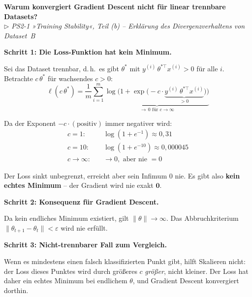 \documentclass[11pt, a4paper]{article}
\newenvironment{frage}[2]{%
  \begin{tcolorbox}[frageboxstyle, title={Frage}]
  \textbf{#1}\\[3pt]
  {\small\itshape\color{black!55}\(\triangleright\) #2}
  \end{tcolorbox}
  \begin{tcolorbox}[antwortboxstyle]
}{%
  \end{tcolorbox}
  \vspace{4mm}
}
\begin{document}
\begin{frage}{Warum konvergiert Gradient Descent nicht für linear trennbare Datasets?}{PS2-1 »Training Stability«, Teil (b) -- Erklärung des Divergenzverhaltens von Dataset~B}

\textbf{Schritt 1: Die Loss-Funktion hat kein Minimum.}

Sei das Dataset trennbar, d.\,h.\ es gibt $\theta^*$ mit $y^{(i)}\,\theta^{*\top} x^{(i)} > 0$
für alle $i$. Betrachte $c\,\theta^*$ für wachsendes $c > 0$:
\[
  \ell(c\,\theta^*)
  = \frac{1}{m} \sum_{i=1}^{m}
    \underbrace{\log\!\bigl(1 + \exp\!\bigl(-c\cdot\underbrace{y^{(i)}\,\theta^{*\top} x^{(i)}}_{>0}\bigr)\bigr)}_{\to\, 0 \text{ für } c\to\infty}
\]

Da der Exponent $-c\cdot(\text{positiv})$ immer negativer wird:
\begin{align*}
  c = 1:   & \quad \log(1 + e^{-1}) \approx 0{,}31 \\
  c = 10:  & \quad \log(1 + e^{-10}) \approx 0{,}000045 \\
  c \to \infty: & \quad \to 0, \text{ aber nie } = 0
\end{align*}

Der Loss sinkt unbegrenzt, erreicht aber sein Infimum $0$ nie. Es gibt also \textbf{kein echtes
Minimum} -- der Gradient wird nie exakt $\mathbf{0}$.

\textbf{Schritt 2: Konsequenz für Gradient Descent.}

Da kein endliches Minimum existiert, gilt $\|\theta\| \to \infty$. Das Abbruchkriterium
$\|\theta_{t+1} - \theta_t\| < \varepsilon$ wird nie erfüllt.

\textbf{Schritt 3: Nicht-trennbarer Fall zum Vergleich.}

Wenn es mindestens einen falsch klassifizierten Punkt gibt, hilft Skalieren nicht: der Loss dieses
Punktes wird durch größeres $c$ \emph{größer}, nicht kleiner. Der Loss hat daher ein echtes Minimum
bei endlichem $\theta$, und Gradient Descent konvergiert dorthin.

\end{frage}
\end{document}
